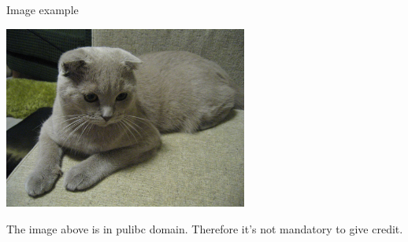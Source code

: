 \begin{frame}{Image example}

  \includegraphics[width=0.6\textwidth]{images/cat-1.jpg}
  
  \vspace{0.3cm}
  
  The image above is in pulibc domain. Therefore it's not mandatory to give credit. 

\end{frame}
